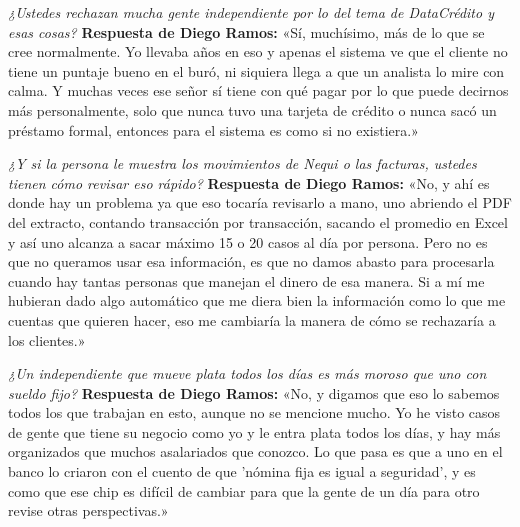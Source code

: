 \documentclass[11pt,a4paper]{article}
\begin{document}
\begin{tcolorbox}[colback=lightgray,colframe=primary,title=\textbf{Pregunta 1: Rechazo de independientes por historial en buró}]
\textit{¿Ustedes rechazan mucha gente independiente por lo del tema de DataCrédito y esas cosas?}
\tcblower
\textbf{Respuesta de Diego Ramos:}  
«Sí, muchísimo, más de lo que se cree normalmente. Yo llevaba años en eso y apenas el sistema ve que el cliente no tiene un puntaje bueno en el buró, ni siquiera llega a que un analista lo mire con calma. Y muchas veces ese señor sí tiene con qué pagar por lo que puede decirnos más personalmente, solo que nunca tuvo una tarjeta de crédito o nunca sacó un préstamo formal, entonces para el sistema es como si no existiera.»
\end{tcolorbox}

\begin{tcolorbox}[colback=lightgray,colframe=primary,title=\textbf{Pregunta 2: Capacidad de procesamiento manual de extractos digitales}]
\textit{¿Y si la persona le muestra los movimientos de Nequi o las facturas, ustedes tienen cómo revisar eso rápido?}
\tcblower
\textbf{Respuesta de Diego Ramos:}  
«No, y ahí es donde hay un problema ya que eso tocaría revisarlo a mano, uno abriendo el PDF del extracto, contando transacción por transacción, sacando el promedio en Excel y así uno alcanza a sacar máximo 15 o 20 casos al día por persona. Pero no es que no queramos usar esa información, es que no damos abasto para procesarla cuando hay tantas personas que manejan el dinero de esa manera. Si a mí me hubieran dado algo automático que me diera bien la información como lo que me cuentas que quieren hacer, eso me cambiaría la manera de cómo se rechazaría a los clientes.»
\end{tcolorbox}

\begin{tcolorbox}[colback=lightgray,colframe=primary,title=\textbf{Pregunta 3: Comportamiento de pago de independientes vs. asalariados}]
\textit{¿Un independiente que mueve plata todos los días es más moroso que uno con sueldo fijo?}
\tcblower
\textbf{Respuesta de Diego Ramos:}  
«No, y digamos que eso lo sabemos todos los que trabajan en esto, aunque no se mencione mucho. Yo he visto casos de gente que tiene su negocio como yo y le entra plata todos los días, y hay más organizados que muchos asalariados que conozco. Lo que pasa es que a uno en el banco lo criaron con el cuento de que 'nómina fija es igual a seguridad', y es como que ese chip es difícil de cambiar para que la gente de un día para otro revise otras perspectivas.»
\end{tcolorbox}
\end{document}
